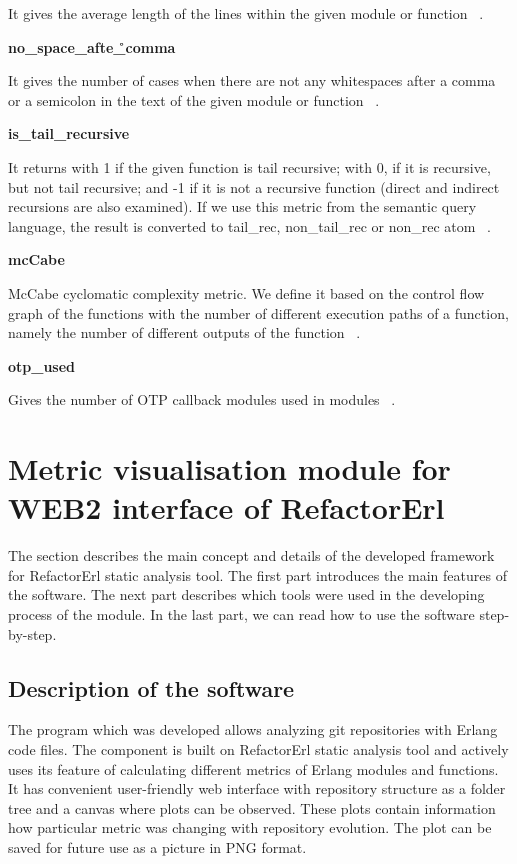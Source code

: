 It gives the average length of the lines within the given module or function ~\cite{refactorerlm}.

\textbf{no\_space\_afte\r\_comma}

It gives the number of cases when there are not any whitespaces after a comma or a semicolon in the text of the given module or function ~\cite{refactorerlm}.

\textbf{is\_tail\_recursive}

It returns with 1 if the given function is tail recursive; with 0, if it is recursive, but not tail recursive; and -1 if it is not a recursive function (direct and indirect recursions are also examined). If we use this metric from the semantic query language, the result is converted to tail\_rec, non\_tail\_rec or non\_rec atom ~\cite{refactorerlm}.

\textbf{mcCabe}

McCabe cyclomatic complexity metric. We define it based on the control flow graph of the functions with the number of different execution paths of a function, namely the number of different outputs of the function ~\cite{refactorerlm}.

\textbf{otp\_used}

Gives the number of OTP callback modules used in modules ~\cite{refactorerlm}.

\section{Metric visualisation module for WEB2 interface of RefactorErl}

The section describes the main concept and details of the developed framework for RefactorErl static analysis tool. The first part introduces the main features of the software. The next part describes which tools were used in the developing process of the module. In the last part, we can read how to use the software step-by-step.

\subsection{Description of the software}

The program which was developed allows analyzing git repositories with Erlang code files. The component is built on RefactorErl static analysis tool and actively uses its feature of calculating different metrics of Erlang modules and functions. It has convenient user-friendly web interface with repository structure as a folder tree and a canvas where plots can be observed. These plots contain information how particular metric was changing with repository evolution. The plot can be saved for future use as a picture in PNG format.

